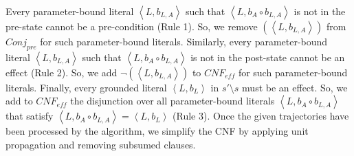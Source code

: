 \documentclass{article}
\newtheorem{lemma}{Lemma}
\newcommand{\tuple}[1]{\ensuremath{\left \langle #1 \right \rangle }}
\newcommand{\pre}{\textit{pre}}
\newcommand{\eff}{\textit{eff}}
\newcommand{\cnf}{\textit{CNF}}
\newcommand{\conj}{\textit{Conj}}
\newcommand{\liftl}{L}
\newcommand{\lifta}{A}
\newcommand{\iseff}{\text{IsEff}}
\newcommand{\ispre}{\text{IsPre}}
\begin{document}
Every parameter-bound literal $\tuple{\liftl,b_{\liftl, \lifta}}$ 
such that $\tuple{\liftl, b_\lifta\circ b_{\liftl,\lifta}}$ is 
not in the pre-state cannot be a pre-condition (Rule 1). So, we remove \ispre$(\tuple{\liftl,b_{\liftl, \lifta}})$ from $\conj_\pre$ for such parameter-bound literals.  
Similarly, every parameter-bound literal $\tuple{\liftl,b_{\liftl, \lifta}}$ 
such that $\tuple{\liftl, b_\lifta\circ b_{\liftl,\lifta}}$ is 
not in the post-state cannot be an effect (Rule 2). So, we add $\neg$\iseff$(\tuple{\liftl,b_{\liftl, \lifta}})$ to $\cnf_\eff$ for such parameter-bound literals.  
Finally, every grounded literal $\tuple{\liftl, b_\liftl}$ in $s'\setminus s$ must be an effect. 
So, we add to $\cnf_\eff$ the disjunction over 
all parameter-bound literals
$\tuple{\liftl, b_\lifta\circ b_{\liftl,\lifta}}$ that satisfy $\tuple{\liftl, b_\lifta\circ b_{\liftl,\lifta}}=\tuple{\liftl, b_\liftl}$ (Rule 3).
Once the given trajectories have been processed by the algorithm, 
we simplify the CNF by applying unit propagation and removing subsumed clauses. 



\end{document}
